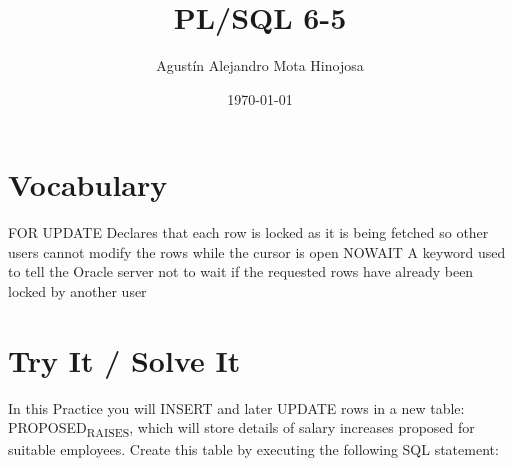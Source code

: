 \documentclass[11pt]{article}
\author{Agustín Alejandro Mota Hinojosa}
\date{\today}
\title{PL/SQL 6-5}
\begin{document}
\maketitle
\tableofcontents

\section{Vocabulary}
\label{sec:orgb6baa31}

FOR UPDATE Declares that each row is locked as it is being fetched so other users cannot modify the rows while the cursor is open
NOWAIT A keyword used to tell the Oracle server not to wait if the requested rows have already been locked by another user
\section{Try It / Solve It}
\label{sec:org6f8e60c}
In this Practice you will INSERT and later UPDATE rows in a new table: PROPOSED\textsubscript{RAISES}, which will store details of salary increases proposed for suitable employees. Create this table by executing the following SQL statement:
\end{document}
